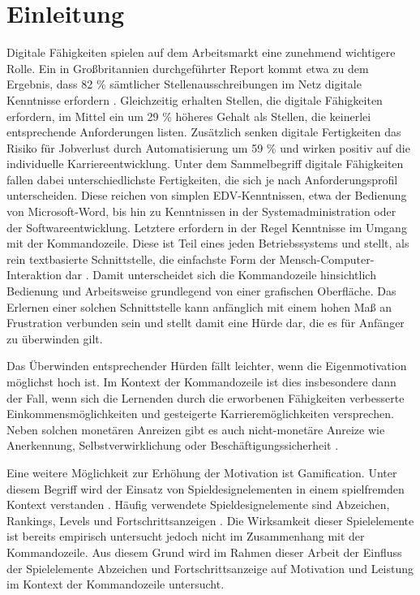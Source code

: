 \section{Einleitung}
Digitale Fähigkeiten spielen auf dem Arbeitsmarkt eine zunehmend wichtigere Rolle. Ein in Großbritannien durchgeführter Report kommt etwa zu dem Ergebnis, dass 82 \% sämtlicher Stellenausschreibungen im Netz digitale Kenntnisse erfordern \cite{no_longer_optional}. Gleichzeitig erhalten Stellen, die digitale Fähigkeiten erfordern, im Mittel ein um 29 \% höheres Gehalt als Stellen, die keinerlei entsprechende Anforderungen listen. Zusätzlich senken digitale Fertigkeiten das Risiko für Jobverlust durch Automatisierung um 59 \% und wirken positiv auf die individuelle Karriereentwicklung. Unter dem Sammelbegriff digitale Fähigkeiten fallen dabei unterschiedlichste Fertigkeiten, die sich je nach Anforderungsprofil unterscheiden. Diese reichen von simplen EDV-Kenntnissen, etwa der Bedienung von Microsoft-Word, bis hin zu Kenntnissen in der Systemadministration oder der Softwareentwicklung. Letztere erfordern in der Regel Kenntnisse im Umgang mit der Kommandozeile. Diese ist Teil eines jeden Betriebssystems und stellt, als rein textbasierte Schnittstelle, die einfachste Form der Mensch-Computer-Interaktion dar \cite{Kumar2005}. Damit unterscheidet sich die Kommandozeile hinsichtlich Bedienung und Arbeitsweise grundlegend von einer grafischen Oberfläche. Das Erlernen einer solchen Schnittstelle kann anfänglich mit einem hohen Maß an Frustration verbunden sein und stellt damit eine Hürde dar, die es für Anfänger zu überwinden gilt.

Das Überwinden entsprechender Hürden fällt leichter, wenn die Eigenmotivation möglichst hoch ist. Im Kontext der Kommandozeile ist dies insbesondere dann der Fall, wenn sich die Lernenden durch die erworbenen Fähigkeiten verbesserte Einkommensmöglichkeiten und gesteigerte Karrieremöglichkeiten versprechen. Neben solchen monetären Anreizen gibt es auch nicht-monetäre Anreize wie Anerkennung, Selbstverwirklichung oder Beschäftigungssicherheit \cite{shujaat}. 

Eine weitere Möglichkeit zur Erhöhung der Motivation ist Gamification. Unter diesem Begriff wird der Einsatz von Spieldesignelementen in einem spielfremden Kontext verstanden \cite{deterding_game_2011}. Häufig verwendete Spieldesignelemente sind Abzeichen, Rankings, Levels und Fortschrittsanzeigen \cite{koch2013gamification}. Die Wirksamkeit dieser Spielelemente ist bereits empirisch untersucht \cite{koivisto_rise_2019} \textendash{} jedoch nicht im Zusammenhang mit der Kommandozeile. Aus diesem Grund wird im Rahmen dieser Arbeit der Einfluss der Spielelemente Abzeichen und Fortschrittsanzeige auf Motivation und Leistung im Kontext der Kommandozeile untersucht.